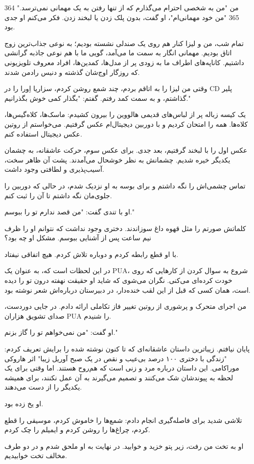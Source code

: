 364   
من   
"من به شخصی احترام می‌گذارم که از تنها رفتن به یک مهمانی نمی‌ترسد." 365   
"من خود مهمانی‌ام"، او گفت، بدون پلک زدن یا لبخند زدن. فکر می‌کنم او جدی بود.

تمام شب، من و لیزا کنار هم روی یک صندلی نشسته بودیم؛ به نوعی جذاب‌ترین زوج اتاق بودیم. مهمانی انگار به سمت ما می‌آمد، گویی ما با هم نوعی جاذبه گرانشی داشتیم. کاناپه‌های اطراف ما به زودی پر از مدل‌ها، کمدین‌ها، افراد معروف تلویزیونی که روزگار اوج‌شان گذشته و دنیس رادمن شدند.

وقتی من لیزا را به اتاقم بردم، چند شمع روشن کردم، سزاریا اِورا را در CD پلیر گذاشتم، و به سمت کمد رفتم. گفتم: "بگذار کمی خوش بگذرانیم."

یک کیسه زباله پر از لباس‌های قدیمی هالووین را بیرون کشیدم: ماسک‌ها، کلاه‌گیس‌ها، کلاه‌ها. همه را امتحان کردیم و با دوربین دیجیتال‌ام عکس گرفتیم. می‌خواستم از روتین عکس دیجیتال استفاده کنم.

عکس اول را با لبخند گرفتیم، بعد جدی. برای عکس سوم، حرکت عاشقانه، به چشمان یکدیگر خیره شدیم. چشمانش به نظر خوشحال می‌آمدند. پشت آن ظاهر سخت، آسیب‌پذیری و لطافتی وجود داشت.

تماس چشمی‌اش را نگه داشتم و برای بوسه به او نزدیک شدم، در حالی که دوربین را جلوی‌مان نگه داشتم تا آن را ثبت کنم.

او با تندی گفت: "من قصد ندارم تو را ببوسم."

کلماتش صورتم را مثل قهوه داغ سوزاندند. دختری وجود نداشت که نتوانم او را ظرف نیم ساعت پس از آشنایی ببوسم. مشکل او چه بود؟

با او قطع رابطه کردم و دوباره تلاش کردم. هیچ اتفاقی نیفتاد.

در این لحظات است که، به عنوان یک PUA، شروع به سوال کردن از کارهایی که روی خودت کرده‌ای می‌کنی. نگران می‌شوی که شاید او حقیقت نهفته درون تو را دیده است، همان کسی که قبل از این لقب خنده‌دار، در دبیرستان درباره‌اش شعر نوشته بود.

من اجرای متحرک و پرشوری از روتین تغییر فاز تکاملی ارائه دادم. در جایی دوردست، صدای تشویق هزاران PUA را شنیدم.

او گفت: "من نمی‌خواهم تو را گاز بزنم."

پایان نیافتم. زیباترین داستان عاشقانه‌ای که تا کنون نوشته شده را برایش تعریف کردم: "زندگی با دختری ۱۰۰ درصد بی‌عیب و نقص در یک صبح آوریل زیبا" اثر هاروکی موراکامی. این داستان درباره مرد و زنی است که هم‌روح هستند. اما وقتی برای یک لحظه به پیوندشان شک می‌کنند و تصمیم می‌گیرند به آن عمل نکنند، برای همیشه یکدیگر را از دست می‌دهند.

او یخ زده بود.

تلاشی شدید برای فاصله‌گیری انجام دادم: شمع‌ها را خاموش کردم، موسیقی را قطع کردم، چراغ‌ها را روشن کردم و ایمیلم را چک کردم.

او به تخت من رفت، زیر پتو خزید و خوابید. در نهایت به او ملحق شدم و در دو طرف مخالف تخت خوابیدیم.
